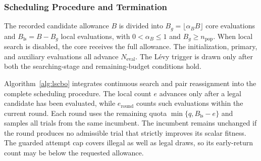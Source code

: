 \documentclass[pdflatex,onecolumn,sn-mathphys-num]{sn-jnl}
\begin{document}
\subsubsection{Scheduling Procedure and Termination}\label{sec:cloud_procedure}
The recorded candidate allowance $B$ is divided into $B_g=\lfloor\alpha_B B\rfloor$ core evaluations and $B_{\mathrm{ls}}=B-B_g$ local evaluations, with $0<\alpha_B\leq1$ and $B_g\geq n_{\mathrm{pop}}$. When local search is disabled, the core receives the full allowance. The initialization, primary, and auxiliary evaluations all advance $N_{\mathrm{eval}}$. The L\'{e}vy trigger is drawn only after both the searching-stage and remaining-budget conditions hold.

Algorithm~\ref{alg:lscbo} integrates continuous search and pair reassignment into the complete scheduling procedure. The local count $e$ advances only after a legal candidate has been evaluated, while $e_{\mathrm{round}}$ counts such evaluations within the current round. Each round uses the remaining quota $\min\{q,B_{\mathrm{ls}}-e\}$ and samples all trials from the same incumbent. The incumbent remains unchanged if the round produces no admissible trial that strictly improves its scalar fitness. The guarded attempt cap covers illegal as well as legal draws, so its early-return count may be below the requested allowance.
\end{document}
